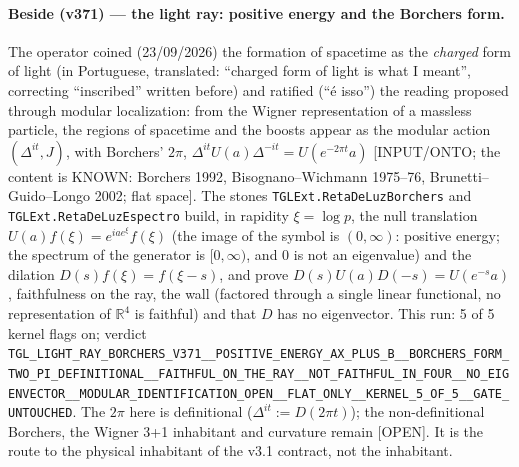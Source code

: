 \documentclass[11pt]{article}
\theoremstyle{definition}\newtheorem{deriv}{Derivation}
\begin{document}
\paragraph*{Beside (v371) --- the light ray: positive energy and the Borchers form.} The operator coined (23/09/2026) the formation of spacetime as the \emph{charged} form of light (in Portuguese, translated: ``charged form of light is what I meant'', correcting ``inscribed'' written before) and ratified (``é isso'') the reading proposed through modular localization: from the Wigner representation of a massless particle, the regions of spacetime and the boosts appear as the modular action $(\Delta^{it},J)$, with Borchers' $2\pi$, $\Delta^{it}U(a)\Delta^{-it}=U(e^{-2\pi t}a)$ [INPUT/ONTO; the content is KNOWN: Borchers 1992, Bisognano--Wichmann 1975--76, Brunetti--Guido--Longo 2002; flat space]. The stones \texttt{TGLExt.RetaDeLuzBorchers} and \texttt{TGLExt.RetaDeLuzEspectro} build, in rapidity $\xi=\log p$, the null translation $U(a)f(\xi)=e^{ia e^{\xi}}f(\xi)$ (the image of the symbol is $(0,\infty)$: positive energy; the spectrum of the generator is $[0,\infty)$, and $0$ is not an eigenvalue) and the dilation $D(s)f(\xi)=f(\xi-s)$, and prove $D(s)U(a)D(-s)=U(e^{-s}a)$, faithfulness on the ray, the wall (factored through a single linear functional, no representation of $\mathbb{R}^4$ is faithful) and that $D$ has no eigenvector. This run: 5 of 5 kernel flags on; verdict \texttt{TGL\_LIGHT\_RAY\_BORCHERS\_V371\_\_POSITIVE\_ENERGY\_AX\_PLUS\_B\_\_BORCHERS\_FORM\_TWO\_PI\_DEFINITIONAL\_\_FAITHFUL\_ON\_THE\_RAY\_\_NOT\_FAITHFUL\_IN\_FOUR\_\_NO\_EIGENVECTOR\_\_MODULAR\_IDENTIFICATION\_OPEN\_\_FLAT\_ONLY\_\_KERNEL\_5\_OF\_5\_\_GATE\_UNTOUCHED}. The $2\pi$ here is definitional ($\Delta^{it}:=D(2\pi t)$); the non-definitional Borchers, the Wigner 3+1 inhabitant and curvature remain [OPEN]. It is the route to the physical inhabitant of the v3.1 contract, not the inhabitant.
\end{document}
